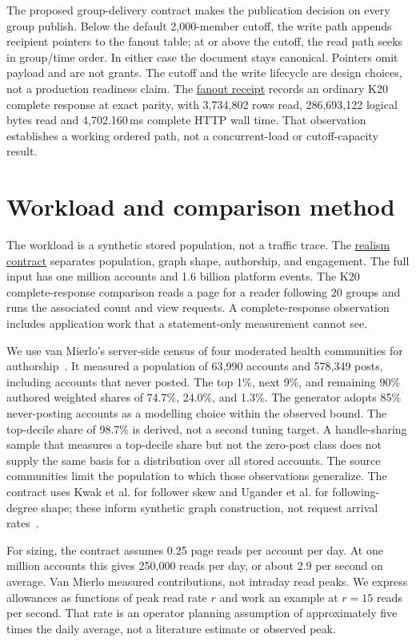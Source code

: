 \documentclass[sigconf,nonacm]{acmart}
\newcommand{\record}[2]{\href{https://github.com/jacoby149/web10/blob/2f397cb13/research/experiments/costfn/#1}{#2}}
\begin{document}
The proposed group-delivery contract makes the publication decision on every group publish. Below the default 2,000-member cutoff, the write path appends recipient pointers to the fanout table; at or above the cutoff, the read path seeks in group/time order. In either case the document stays canonical. Pointers omit payload and are not grants. The cutoff and the write lifecycle are design choices, not a production readiness claim. The \record{ARM-F-DESIGN-CLOSURE.md}{fanout receipt} records an ordinary K20 complete response at exact parity, with 3,734,802 rows read, 286,693,122 logical bytes read and 4,702.160\,ms complete HTTP wall time. That observation establishes a working ordered path, not a concurrent-load or cutoff-capacity result.

\section{Workload and comparison method}
\label{sec:workload}
The workload is a synthetic stored population, not a traffic trace. The \record{REALISM-RERUN-PLAN.md}{realism contract} separates population, graph shape, authorship, and engagement. The full input has one million accounts and 1.6 billion platform events. The K20 complete-response comparison reads a page for a reader following 20 groups and runs the associated count and view requests. A complete-response observation includes application work that a statement-only measurement cannot see.

We use van Mierlo's server-side census of four moderated health communities for authorship~\cite{vanmierlo}. It measured a population of 63,990 accounts and 578,349 posts, including accounts that never posted. The top 1\%, next 9\%, and remaining 90\% authored weighted shares of 74.7\%, 24.0\%, and 1.3\%. The generator adopts 85\% never-posting accounts as a modelling choice within the observed bound. The top-decile share of 98.7\% is derived, not a second tuning target. A handle-sharing sample that measures a top-decile share but not the zero-post class does not supply the same basis for a distribution over all stored accounts. The source communities limit the population to which those observations generalize. The contract uses Kwak et al. for follower skew and Ugander et al. for following-degree shape; these inform synthetic graph construction, not request arrival rates~\cite{kwak,ugander}.

For sizing, the contract assumes 0.25 page reads per account per day. At one million accounts this gives 250,000 reads per day, or about 2.9 per second on average. Van Mierlo measured contributions, not intraday read peaks. We express allowances as functions of peak read rate $r$ and work an example at $r=15$ reads per second. That rate is an operator planning assumption of approximately five times the daily average, not a literature estimate or observed peak.
\end{document}
